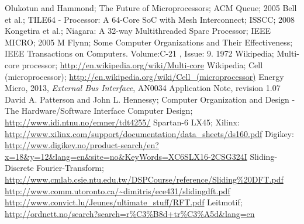 \clearpage{}
\begin{thebibliography}{1}

 Olukotun and Hammond; The Future of Microprocessors;
	ACM Queue; 2005
 Bell et al.; TILE64 - Processor: A 64-Core SoC with Mesh
	Interconnect; ISSCC; 2008
 Kongetira et al.; Niagara: A 32-way Multithreaded Sparc
	Processor; IEEE MICRO; 2005
 M Flynn; Some Computer Organizations and Their Effectiveness;
	IEEE Transactions on Computers. Volume:C-21 , Issue: 9. 1972
 Wikipedia; Multi-core processor;\newline
	\url{http://en.wikipedia.org/wiki/Multi-core}
 Wikipedia; Cell (microprocessor);\newline
	\url{http://en.wikipedia.org/wiki/Cell_(microprocessor)}
	Energy Micro, 2013,\newline
	\textsl{External Bus Interface}, AN0034 Application Note, revision 1.07
 David A. Patterson and John L. Hennessy; Computer
	Organization and Design - The Hardware/Software Interface
 Computer Design;\newline
	\url{http://www.idi.ntnu.no/emner/tdt4255/}
 Spartan-6 LX45; \newline
	Xilinx: \url{http://www.xilinx.com/support/documentation/data_sheets/ds160.pdf}
	\newline
	Digikey: \url{
	http://www.digikey.no/product-search/en?x=18&y=12&lang=en&site=no&KeyWords=XC6SLX16-2CSG324I}
 Sliding-Discrete Fourier-Transform;\newline
	\url{http://www.cmlab.csie.ntu.edu.tw/DSPCourse/reference/Sliding%20DFT.pdf}
	\newline
	\url{http://www.comm.utoronto.ca/~dimitris/ece431/slidingdft.pdf}
	\newline
	\url{http://www.convict.lu/Jeunes/ultimate_stuff/RFT.pdf}
 Leitmotif;\newline
	\url{http://ordnett.no/search?search=r%C3%B8d+tr%C3%A5d&lang=en}
\end{thebibliography}

